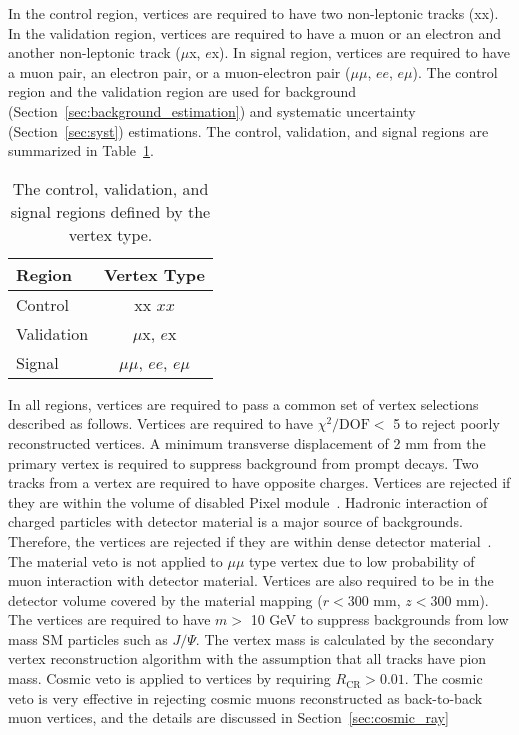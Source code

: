 In the control region, vertices are required to have two non-leptonic tracks (xx). In the validation region, vertices are required to have a muon or an electron and another non-leptonic track ($\mu$x, $e$x). In signal region, vertices are required to have a muon pair, an electron pair, or a muon-electron pair ($\mu\mu$, $ee$, $e\mu$). The control region and the validation region are used for background (Section~\ref{sec:background_estimation}) and systematic uncertainty (Section~\ref{sec:syst}) estimations. The control, validation, and signal regions are summarized in Table~\ref{table:vertex_type}.

\begin{table}[!h]
  \centering
  \begin{tabular}{ l  c}
    \hline
    \hline
	Region				& Vertex Type										\\
    \hline
	Control     		& xx $xx$   										\\
	Validation       	& $\mu$x, $e$x										\\
	Signal       		& $\mu\mu$, $ee$, $e\mu$							\\
    \hline
    \hline
  \end{tabular}
  \caption{The control, validation, and signal regions defined by the vertex type.}
  \label{table:vertex_type}
\end{table}

In all regions, vertices are required to pass a common set of vertex selections described as follows. Vertices are required to have $\chi^2 / \mathrm{ DOF} <$ 5 to reject poorly reconstructed vertices. A minimum transverse displacement of 2 mm from the primary vertex is required to suppress background from prompt decays. Two tracks from a vertex are required to have opposite charges. Vertices are rejected if they are within the volume of disabled Pixel module~\cite{Backhaus:2110260}. Hadronic interaction of charged particles with detector material is a major source of backgrounds. Therefore, the vertices are rejected if they are within dense detector material~\cite{Aaboud:2016poq}. The material veto is not applied to $\mu\mu$ type vertex due to low probability of muon interaction with detector material. Vertices are also required to be in the detector volume covered by the material mapping ($r < 300$ \si{mm}, $z < 300$ \si{mm}). The vertices are required to have $m >$ 10 GeV to suppress backgrounds from low mass SM particles such as $J/\Psi$. The vertex mass is calculated by the secondary vertex reconstruction algorithm with the assumption that all tracks have pion mass. Cosmic veto is applied to vertices by requiring $R_{\mathrm{CR}} > 0.01$. The cosmic veto is very effective in rejecting cosmic muons reconstructed as back-to-back muon vertices, and the details are discussed in Section~\ref{sec:cosmic_ray}

